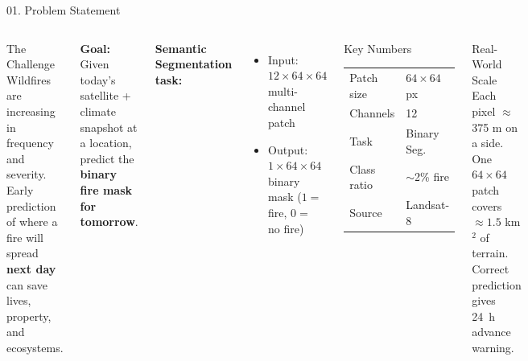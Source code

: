 ﻿\documentclass[aspectratio=169,t]{beamer}
\begin{document}
\begin{frame}{01. Problem Statement}
\begin{columns}[t]
\begin{alertblock}{The Challenge}
Wildfires are increasing in frequency and severity. Early prediction of where a fire will spread \textbf{next day} can save lives, property, and ecosystems.
\end{alertblock}
\vspace{0.3cm}
\textcolor{accent}{\textbf{Goal:}} Given today's satellite + climate snapshot at a location, predict the \textbf{binary fire mask for tomorrow}.
\vspace{0.3cm}

\textcolor{accentgreen}{\textbf{Semantic Segmentation task:}}
\begin{itemize}
  \item Input: $12 \times 64 \times 64$ multi-channel patch
  \item Output: $1 \times 64 \times 64$ binary mask ($1=$ fire, $0=$ no fire)
\end{itemize}
\begin{block}{Key Numbers}
\small
\begin{tabular}{ll}
\textcolor{accent}{Patch size} & $64 \times 64$ px \\
\textcolor{accent}{Channels}   & 12 \\
\textcolor{accent}{Task}       & Binary Seg. \\
\textcolor{accent}{Class ratio}& $\sim$2\% fire \\
\textcolor{accent}{Source}     & Landsat-8 \\
\end{tabular}
\end{block}
\vspace{0.2cm}
\begin{exampleblock}{Real-World Scale}
\small
Each pixel $\approx$ 375 m on a side.\\
One $64\times64$ patch covers $\approx 1.5$ km$^2$ of terrain.\\
Correct prediction gives 24~h advance warning.
\end{exampleblock}
\end{columns}
\end{frame}
\end{document}
